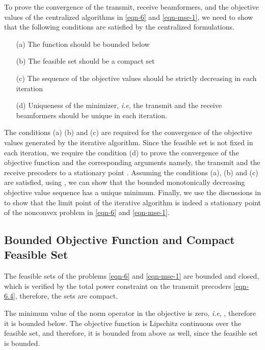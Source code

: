 To prove the convergence of the transmit, receive beamformers, and the objective values of the centralized algorithms in \eqref{eqn-6} and \eqref{eqn-mse-1}, we need to show that the following conditions are satisfied by the centralized formulations.
\begin{itemize}
	\item[(a)] The function should be bounded below
	\item[(b)] The feasible set should be a compact set
	\item[(c)] The sequence of the objective values should be strictly decreasing in each iteration
	\item[(d)] Uniqueness of the minimizer, \textit{i.e}, the transmit and the receive beamformers should be unique in each iteration.
\end{itemize}
The conditions (a) (b) and (c) are required for the convergence of the objective values generated by the iterative algorithm. Since the feasible set is not fixed in each iteration, we require the condition (d) to prove the convergence of the objective function and the corresponding arguments namely, the transmit and the receive precoders to a stationary point \cite{meyer1976sufficient}. Assuming the conditions (a), (b) and (c) are satisfied, using \cite[Th. 3.14]{rudin1964principles}, we can show that the bounded monotonically decreasing objective value sequence has a unique minimum. Finally, we use the discussions in \cite{marks1978technical,lanckriet2009convergence,scutari_1} to show that the limit point of the iterative algorithm is indeed a stationary point of the nonconvex problem in \eqref{eqn-6} and \eqref{eqn-mse-1}.

\subsection{Bounded Objective Function and Compact Feasible Set}
The feasible sets of the problems \eqref{eqn-6} and \eqref{eqn-mse-1} are bounded and closed, which is verified by the total power constraint on the transmit precoders \eqref{eqn-6.4}, therefore, the sets are compact. 

The minimum value of the norm operator in the objective is zero, \textit{i.e}, , therefore it is bounded below. The objective function is Lipschitz continuous over the feasible set, and therefore, it is bounded from above as well, since the feasible set is bounded. %

